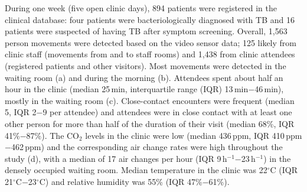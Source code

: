 \documentclass[fleqn,11pt]{wlscirep}
\begin{document}
During one week (five open clinic days), 894 patients were registered in the clinical database: four patients were bacteriologically diagnosed with TB and 16 patients were suspected of having TB after symptom screening. Overall, 1,563 person movements were detected based on the video sensor data; 125 likely from clinic staff (movements from and to staff rooms) and 1,438 from clinic attendees (registered patients and other visitors). Most movements were detected in the waiting room (a) and during the morning (b). Attendees spent about half an hour in the clinic (median 25\,min, interquartile range (IQR) 13\,min$-$46\,min), mostly in the waiting room (c).  Close-contact encounters were frequent (median 5, IQR 2$-$9 per attendee) and attendees were in close contact with at least one other person for more than half of the duration of their visit (median 68\%, IQR 41\%$-$87\%). The CO$_2$ levels in the clinic were low (median 436\,ppm, IQR 410\,ppm$-$462\,ppm)  and the corresponding air change rates were high throughout the study (d), with a median of 17 air changes per hour (IQR 9\,h$^{-1}$$-$23\,h$^{-1}$) in the densely occupied waiting room.  Median temperature in the clinic was 22$^{\circ}$C (IQR 21$^{\circ}$C$-$23$^{\circ}$C) and relative humidity was 55\% (IQR 47\%$-$61\%).
\end{document}
